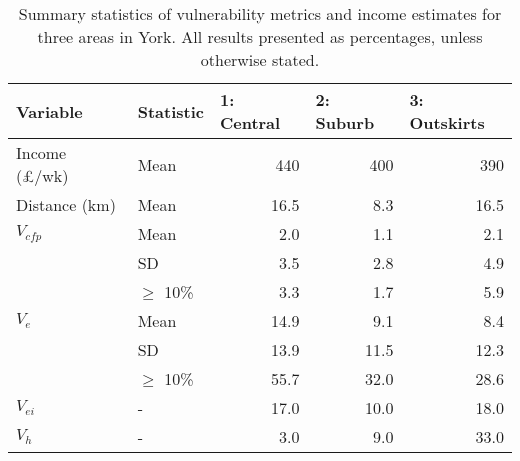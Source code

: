 \begin{table}[htbp]
\caption[Summary statistics of vulnerability metrics]{Summary statistics of
vulnerability metrics and income
estimates for three areas in York. All results presented as
percentages, unless otherwise stated.}
\begin{center}
\begin{tabular}{|l|l|r|r|r|}
\hline
Variable & Statistic & \multicolumn{1}{l|}{1: Central} &
\multicolumn{1}{l|}{2: Suburb} & \multicolumn{1}{l|}{3: Outskirts} \\ \hline
\multicolumn{ 1}{|l|}{Income (\pounds/wk)} & Mean & 440 & 400 & 390 \\ \hline
\multicolumn{ 1}{|l|}{Distance (km)} & Mean & 16.5 & 8.3 & 16.5 \\ \hline
\multicolumn{ 1}{|l|}{$V_{cfp}$} & Mean & 2.0 & 1.1 & 2.1 \\
\multicolumn{ 1}{|l|}{} & SD & 3.5 & 2.8 & 4.9 \\
\multicolumn{ 1}{|l|}{} & $\geq$ 10\% & 3.3 & 1.7 & 5.9 \\ \hline
\multicolumn{ 1}{|l|}{$V_e$} & Mean & 14.9 & 9.1 & 8.4 \\
\multicolumn{ 1}{|l|}{} & SD & 13.9 & 11.5 & 12.3 \\
\multicolumn{ 1}{|l|}{} & $\geq$ 10\% & 55.7 & 32.0 & 28.6 \\ \hline
$V_{ei}$ & - & 17.0 & 10.0 & 18.0 \\ \hline
$V_h$ & - & 3.0 & 9.0 & 33.0 \\ \hline
\end{tabular}\end{center}
\label{t:ind}
\end{table}

